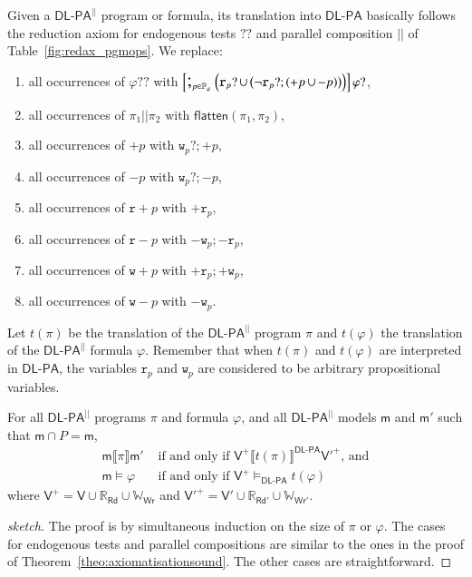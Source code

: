 \documentclass{llncs}
\newcommand{\progFlatten}{\mathsf{flatten}}
\newcommand{\modl}{\mathsf m}
\newcommand{\pll}{ {||} }							%
\newcommand{\readOf}[1]{\mathbb{R}_{#1}}
\newcommand{\readable}[1]{\mathtt{r}_{#1}}
\newcommand{\readset}{\mathsf{Rd}}
\newcommand{\valuset}{\mathsf{V}}
\newcommand{\writable}[1]{\mathtt{w}_{#1}}
\newcommand{\writeset}{\mathsf{Wr}}
\newcommand{\testendo}{?\!\!?}			%
\newcommand{\testpdl}{?}				%
\newcommand{\writeOf}[1]{\mathbb{W}_{#1}}
\newcommand{\Dlpa}{\ensuremath{\mathsf{DL\text{-}PA}}\xspace}
\newcommand{\DlpaPll}{\ensuremath{\mathsf{DL\text{-}PA}^\pll}\xspace}
\newcommand{\assgntop}[1]{{\mathtt {+} #1}}
\newcommand{\assgnbot}[1]{{\mathtt {-} #1}}
\newcommand{\assgntopR}[1]{{\mathtt r {+} #1}}
\newcommand{\assgnbotR}[1]{{\mathtt r {-} #1}}
\newcommand{\assgntopW}[1]{{\mathtt w {+} #1}}
\newcommand{\assgnbotW}[1]{{\mathtt w {-} #1}}
\newcommand{\assgntopV}[1]{{\mathtt {+} #1}}
\newcommand{\assgnbotV}[1]{{\mathtt {-} #1}}
\newcommand{\intPgm}[1]{\llbracket #1 \rrbracket}
\newcommand{\ndet}{\,{\cup}\,}
\renewcommand{\phi}{\varphi}
\newcommand{\propset}{\mathbb P}
\newcommand{\propsetOf}[1]{\propset_{#1}}
\newcommand{\modinter}{\cap}
\newcommand{\seqseq}[1]{ \text{\Large ;}_{#1} ~ }
\begin{document}
Given a \DlpaPll program or formula, its translation into \Dlpa basically follows the reduction axiom for endogenous tests $\testendo$ and parallel composition $ \pll $ of Table~\ref{fig:redax_pgmops}. 
We replace:
\begin{enumerate}
\item
all occurrences of $\phi \testendo $ with 
$\left[\seqseq{p \in \propsetOf \phi} \Big(
\readable{p} \testpdl \ndet \big( \lnot \readable{p} \testpdl ; (\assgntopV{p} \ndet \assgnbotV{p}) \big) 
\Big)\right] \phi \testpdl $,
\item
all occurrences of $ \pi_1 \pll \pi_2 $ with $\progFlatten(\pi_1, \pi_2)$,
\item
all occurrences of $\assgntopV p$ with $\writable p ? ; \assgntopV p$,
\item
all occurrences of $\assgnbotV p$ with $\writable p ? ; \assgnbotV p$,
\item
all occurrences of $\assgntopR{p}$ with $\assgntop{ \readable{p}}$,
\item
all occurrences of $\assgnbotR{p}$ with $\assgnbot{ \writable{p}} ; \assgnbot{ \readable{p}}$,
\item
all occurrences of $\assgntopW{p}$ with $\assgntop{ \readable{p}} ; \assgntop{ \writable{p}}$,
\item
all occurrences of $\assgnbotW{p}$ with $\assgnbot{ \writable{p}}$.
\end{enumerate}
Let $t(\pi)$ be the translation of the \DlpaPll program $\pi$ and
$t(\phi)$ the translation of the \DlpaPll formula $\phi$.
Remember that when $t(\pi)$ and $t(\phi)$ are interpreted in \Dlpa, the variables $\readable p$ and $\writable{p}$ 
are considered to be arbitrary propositional variables. 

\begin{lemma}\label{lem:dlpatradcorrect}
For all \DlpaPll programs $\pi$ and formula $\phi$, and all \DlpaPll models $\modl$ and $\modl'$ such that $\modl \modinter P = \modl$,
\begin{align*}
  \modl \intPgm{\pi} \modl' &\text{ if and only if } \valuset^+ \intPgm{t(\pi)}^{\Dlpa} \valuset'^+ \text{, and} \\
  \modl \models \phi        &\text{ if and only if } \valuset^+ \models_{\Dlpa} t(\phi)
\end{align*}
where $\valuset^+  = \valuset  \cup \readOf{\readset } \cup \writeOf{\writeset }$
and   $\valuset'^+ = \valuset' \cup \readOf{\readset'} \cup \writeOf{\writeset'}$.
\end{lemma}
\begin{proof}[sketch]
The proof is by simultaneous induction on the size of $\pi$ or $\phi$.
The cases for endogenous tests and parallel compositions are similar to the ones in the proof of Theorem~\ref{theo:axiomatisationsound}.
The other cases are straightforward.
\end{proof}
\end{document}
